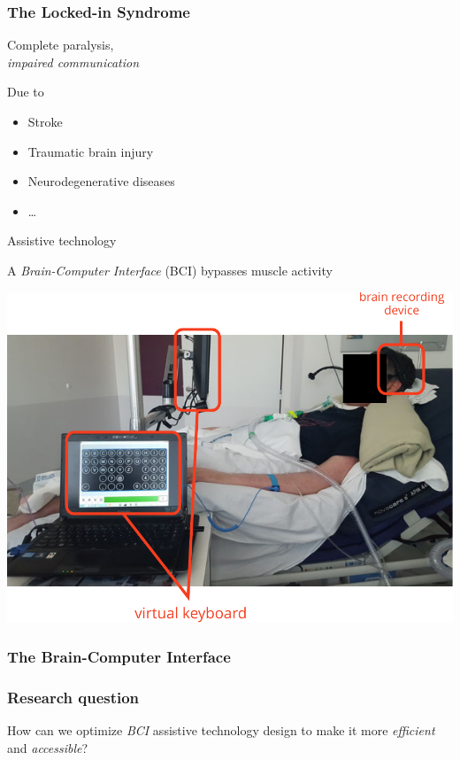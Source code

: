 \documentclass{kul-ulille-beamer}
\begin{document}
\begin{frame}[noframenumbering]
  \frametitle{The Locked-in Syndrome}
  \centering
  \begin{minipage}[c]{.4\textwidth}
    \small
    \raggedright
    Complete paralysis, \\ \emph{impaired communication}
    \bigskip

    Due to
    \begin{itemize}
      \item Stroke
      \item Traumatic brain injury
      \item Neurodegenerative diseases
      \item \ldots
    \end{itemize}
    \bigskip

  Assistive technology
  \bigskip

    A \emph{Brain-Computer Interface} (BCI) bypasses muscle activity

 \end{minipage}\hfill%
  \begin{minipage}[c]{.5\textwidth}
    \includegraphics[width=\textwidth]{figures/intro/damien_annot.pdf}
  \end{minipage}
\end{frame}



\begin{frame}
  \frametitle{The Brain-Computer Interface}
\end{frame}


\begin{frame}[c]
  \frametitle{Research question}
  \centering

  \begin{minipage}{.8\textwidth}
  \centering
  \huge
  How can we optimize \emph{BCI}  assistive technology design  to make it more
    \emph{efficient} and  \emph{accessible}?
  \end{minipage}

\end{frame}
\end{document}
